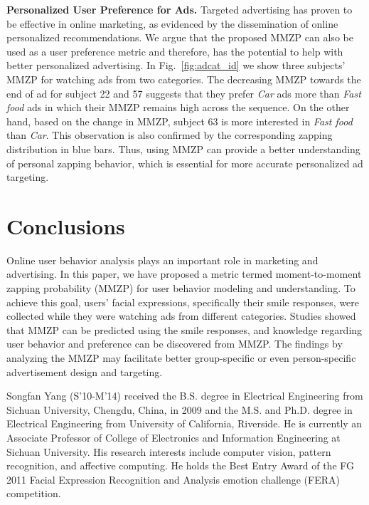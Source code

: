 \documentclass[10pt,journal,cspaper,compsoc]{IEEEtran}
\begin{document}
\noindent \textbf{Personalized User Preference for Ads.} Targeted advertising has proven to be effective in online marketing, as evidenced by the dissemination of online personalized recommendations. We argue that the proposed MMZP can also be used as a user preference metric and therefore, has the potential to help with better personalized advertising. In Fig.~\ref{fig:adcat_id} we show three subjects' MMZP for watching ads from two categories. The decreasing MMZP towards the end of ad for subject 22 and 57 suggests that they prefer \textit{Car} ads more than \textit{Fast food} ads in which their MMZP remains high across the sequence. On the other hand, based on the change in MMZP, subject 63 is more interested in \textit{Fast food} than \textit{Car}. This observation is also confirmed by the corresponding zapping distribution in blue bars. Thus, using MMZP can provide a better understanding of personal zapping behavior, which is essential for more accurate personalized ad targeting.


\section{Conclusions}

Online user behavior analysis plays an important role in marketing and advertising. In this paper, we have proposed a metric termed moment-to-moment zapping probability (MMZP) for user behavior modeling and understanding. To achieve this goal, users' facial expressions, specifically their smile responses, were collected while they were watching ads from different categories. Studies showed that MMZP can be predicted using the smile responses, and knowledge regarding user behavior and preference can be discovered from MMZP. The findings by analyzing the MMZP may facilitate better group-specific or even person-specific advertisement design and targeting. 


\ifCLASSOPTIONcaptionsoff
  \newpage
\fi






\begin{IEEEbiography}{Songfan Yang}
(S'10-M'14) received the B.S. degree in Electrical Engineering from Sichuan University, Chengdu, China, in 2009 and the M.S. and Ph.D. degree in Electrical Engineering from University of California, Riverside. He is currently an Associate Professor of College of Electronics and Information Engineering at Sichuan University. His research interests include computer vision, pattern recognition, and affective computing. He holds the Best Entry Award of the FG 2011 Facial Expression Recognition and Analysis emotion challenge (FERA) competition.
\end{IEEEbiography}
\end{document}
